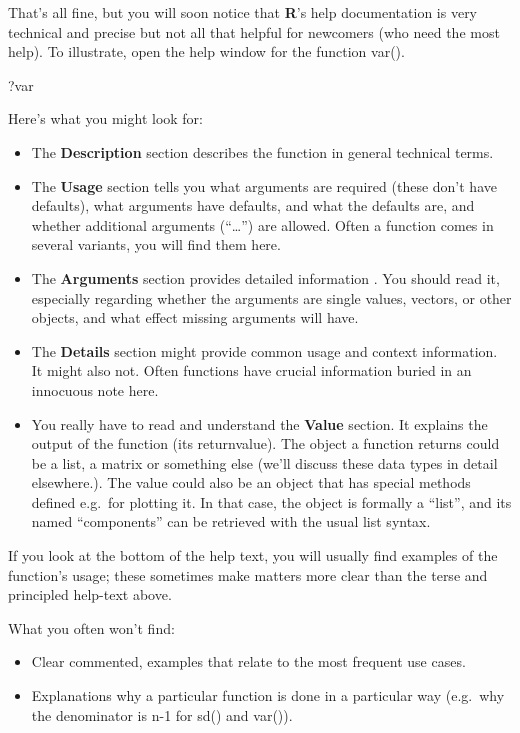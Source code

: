 \documentclass[
]{book}
\newenvironment{Shaded}{\begin{snugshade}}{\end{snugshade}}
\newcommand{\NormalTok}[1]{#1}
\providecommand{\tightlist}{%
  \setlength{\itemsep}{0pt}\setlength{\parskip}{0pt}}
\begin{document}
That's all fine, but you will soon notice that \textbf{R}'s help documentation is very technical and precise but not all that helpful for newcomers (who need the most help). To illustrate, open the help window for the function var().

\begin{Shaded}
\begin{Highlighting}[]
\NormalTok{?var}
\end{Highlighting}
\end{Shaded}

Here's what you might look for:

\begin{itemize}
\tightlist
\item
  The \textbf{Description} section describes the function in general technical terms.
\item
  The \textbf{Usage} section tells you what arguments are required (these don't have defaults), what arguments have defaults, and what the defaults are, and whether additional arguments (``\ldots{}'') are allowed. Often a function comes in several variants, you will find them here.
\item
  The \textbf{Arguments} section provides detailed information . You should read it, especially regarding whether the arguments are single values, vectors, or other objects, and what effect missing arguments will have.
\item
  The \textbf{Details} section might provide common usage and context information. It might also not. Often functions have crucial information buried in an innocuous note here.
\item
  You really have to read and understand the \textbf{Value} section. It explains the output of the function (its returnvalue). The object a function returns could be a list, a matrix or something else (we'll discuss these data types in detail elsewhere.). The value could also be an object that has special methods defined e.g.~for plotting it. In that case, the object is formally a ``list'', and its named ``components'' can be retrieved with the usual list syntax.
\end{itemize}

If you look at the bottom of the help text, you will usually find examples of the function's usage; these sometimes make matters more clear than the terse and principled help-text above.

What you often won't find:

\begin{itemize}
\tightlist
\item
  Clear commented, examples that relate to the most frequent use cases.
\item
  Explanations why a particular function is done in a particular way (e.g.~why the denominator is n-1 for sd() and var()).
\end{itemize}
\end{document}
